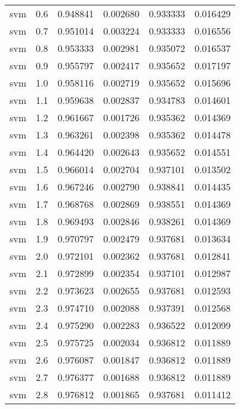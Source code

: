 \begin{tabular}{lrrrrr}
     svm &        0.6 &    0.948841 &   0.002680 &   0.933333 &  0.016429 \\
     svm &        0.7 &    0.951014 &   0.003224 &   0.933333 &  0.016556 \\
     svm &        0.8 &    0.953333 &   0.002981 &   0.935072 &  0.016537 \\
     svm &        0.9 &    0.955797 &   0.002417 &   0.935652 &  0.017197 \\
     svm &        1.0 &    0.958116 &   0.002719 &   0.935652 &  0.015696 \\
     svm &        1.1 &    0.959638 &   0.002837 &   0.934783 &  0.014601 \\
     svm &        1.2 &    0.961667 &   0.001726 &   0.935362 &  0.014369 \\
     svm &        1.3 &    0.963261 &   0.002398 &   0.935362 &  0.014478 \\
     svm &        1.4 &    0.964420 &   0.002643 &   0.935652 &  0.014551 \\
     svm &        1.5 &    0.966014 &   0.002704 &   0.937101 &  0.013502 \\
     svm &        1.6 &    0.967246 &   0.002790 &   0.938841 &  0.014435 \\
     svm &        1.7 &    0.968768 &   0.002869 &   0.938551 &  0.014369 \\
     svm &        1.8 &    0.969493 &   0.002846 &   0.938261 &  0.014369 \\
     svm &        1.9 &    0.970797 &   0.002479 &   0.937681 &  0.013634 \\
     svm &        2.0 &    0.972101 &   0.002362 &   0.937681 &  0.012841 \\
     svm &        2.1 &    0.972899 &   0.002354 &   0.937101 &  0.012987 \\
     svm &        2.2 &    0.973623 &   0.002655 &   0.937681 &  0.012593 \\
     svm &        2.3 &    0.974710 &   0.002088 &   0.937391 &  0.012568 \\
     svm &        2.4 &    0.975290 &   0.002283 &   0.936522 &  0.012099 \\
     svm &        2.5 &    0.975725 &   0.002034 &   0.936812 &  0.011889 \\
     svm &        2.6 &    0.976087 &   0.001847 &   0.936812 &  0.011889 \\
     svm &        2.7 &    0.976377 &   0.001688 &   0.936812 &  0.011889 \\
     svm &        2.8 &    0.976812 &   0.001865 &   0.937681 &  0.011412 \\

\end{tabular}

